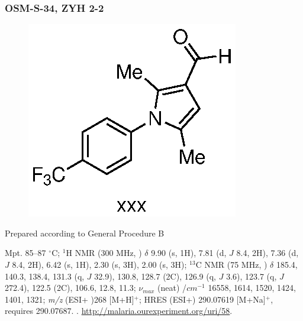 \documentclass[12pt, a4paper,titlepage]{article}
\begin{document}
{\subsubsection*{OSM-S-34, ZYH 2-2}
\label{exp:ZYH2}
	\begin{figure}[H]
	\begin{center}
	\includegraphics{exp/ZYH2.eps}
	\end{center}
	\vspace{-25pt}	
	\end{figure}


Prepared according to General Procedure B


Mpt. 85--87 $^\circ$C; 
$^1$H NMR (300 MHz, ) $\delta$ 9.90 (s, 1H), 7.81 (d, $J$ 8.4, 2H), 7.36 (d, $J$ 8.4, 2H), 6.42 (s, 1H), 2.30 (s, 3H), 2.00 (s, 3H);
$^{13}$C NMR (75 MHz, ) $\delta$  185.4, 140.3, 138.4, 131.3 (q, $J$ 32.9), 130.8, 128.7 (2C), 126.9 (q, $J$ 3.6), 123.7 (q, $J$ 272.4), 122.5 (2C), 106.6, 12.8, 11.3; 
 $\nu_{max}$ (neat) /$cm^{-1}$ 16558, 1614, 1520, 1424, 1401, 1321; 
\emph{m/z} (ESI+ )268 [M+H]$^+$; HRES (ESI+) 290.07619  [M+Na]$^+$,  requires 290.07687.
. 
\url{http://malaria.ourexperiment.org/uri/58}. 

}
\end{document}
